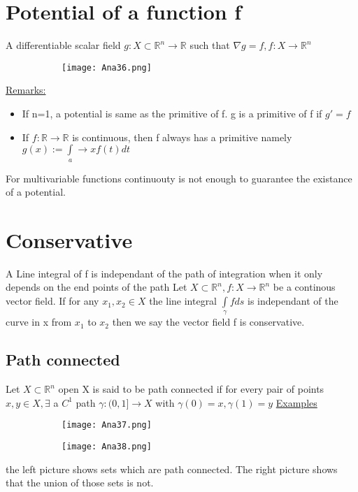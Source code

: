 \documentclass[8pt]{extreport}
\newcommand{\R}{\mathbb{R}}
\begin{document}
\section{Potential of a function f}
A differentiable scalar field $g: X \subset \R^n \to \R$ such that $\nabla g = f, f: X \to \R^n$
\begin{figure}[H]
\centering
\begin{subfigure}[b]{0.4\linewidth}
\texttt{[image: Ana36.png]}
\end{subfigure}
\end{figure}
\underline{Remarks:}
\begin{itemize}
\item If n=1, a potential is same as the primitive of f. g is a primitive of f if $g' = f$
\item If $f:\R \to \R$ is continuous, then f always has a primitive namely $g(x):= \int\limits_a \to x f(t)dt$
\end{itemize}
For multivariable functions continuouty is not enough to guarantee the existance of a potential.

\section{Conservative}
A Line integral of f is independant of the path of integration when it only depends on the end points of the path
Let $X \subset \R^n, f: X \to \R^n$ be a continous vector field. If for any $x_1,x_2\in X$ the line integral $\int\limits_{\gamma}fds$ is independant of the curve in x from $x_1$ to $x_2$ then we say the vector field f is conservative.

\subsection{Path connected}
Let $X \subset \R^n$ open X is said to be path connected if for every pair of points $x,y \in X, \exists$ a $C^1$ path $\gamma: (0,1] \to X$ with $\gamma(0) = x, \gamma(1) = y$
\underline{Examples}
\begin{figure}[H]
\centering
\begin{subfigure}[b]{0.4\linewidth}
\texttt{[image: Ana37.png]}
\end{subfigure}
\begin{subfigure}[b]{0.4\linewidth}
\texttt{[image: Ana38.png]}
\end{subfigure}
\end{figure}
the left picture shows sets which are path connected. The right picture shows that the union of those sets is not.
\end{document}

